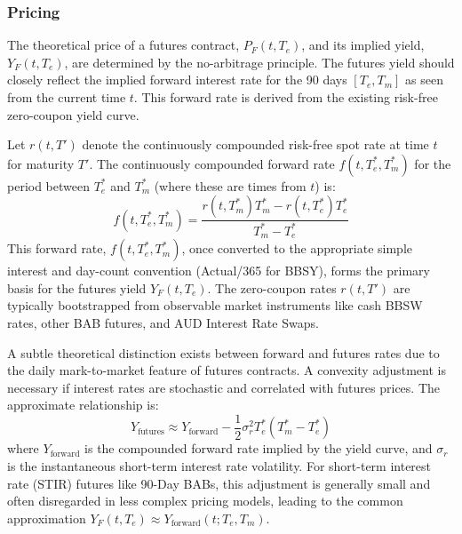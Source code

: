 \documentclass[11pt, a4paper, british]{article}
\begin{document}
\subsubsection{Pricing}
The theoretical price of a futures contract, $P_F(t, T_e)$, and its implied yield, $Y_F(t, T_e)$, are determined by the no-arbitrage principle. The futures yield should closely reflect the implied forward interest rate for the 90 days $[T_e, T_m]$ as seen from the current time $t$. This forward rate is derived from the existing risk-free zero-coupon yield curve.

Let $r(t, T')$ denote the continuously compounded risk-free spot rate at time $t$ for maturity $T'$. The continuously compounded forward rate $f(t, T_e^*, T_m^*)$ for the period between $T_e^*$ and $T_m^*$ (where these are times from $t$) is:
\begin{equation} \label{eq:cont_forward_rate}
 f(t, T_e^*, T_m^*) = \frac{r(t, T_m^*)T_m^* - r(t, T_e^*)T_e^*}{T_m^* - T_e^*}
\end{equation}
This forward rate, $f(t, T_e^*, T_m^*)$, once converted to the appropriate simple interest and day-count convention (Actual/365 for BBSY), forms the primary basis for the futures yield $Y_F(t, T_e)$. The zero-coupon rates $r(t, T')$ are typically bootstrapped from observable market instruments like cash BBSW rates, other BAB futures, and AUD Interest Rate Swaps.

A subtle theoretical distinction exists between forward and futures rates due to the daily mark-to-market feature of futures contracts. A convexity adjustment is necessary if interest rates are stochastic and correlated with futures prices. The approximate relationship is:
\begin{equation} \label{eq:convexity_adjustment}
 Y_{\text{futures}} \approx Y_{\text{forward}} - \frac{1}{2} \sigma_r^2 T_e^* (T_m^* - T_e^*)
\end{equation}
where $Y_{\text{forward}}$ is the compounded forward rate implied by the yield curve, and $\sigma_r$ is the instantaneous short-term interest rate volatility. For short-term interest rate (STIR) futures like 90-Day BABs, this adjustment is generally small and often disregarded in less complex pricing models, leading to the common approximation $Y_F(t, T_e) \approx Y_{\text{forward}}(t; T_e, T_m)$.
\end{document}

